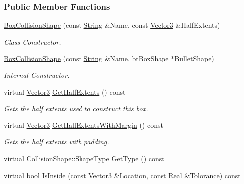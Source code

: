 \subsubsection*{Public Member Functions}
\begin{DoxyCompactItemize}
\item 
\hyperlink{classphys_1_1BoxCollisionShape_a1739863d96d1e4eea34eea8a47ec097f}{BoxCollisionShape} (const \hyperlink{namespacephys_aa03900411993de7fbfec4789bc1d392e}{String} \&Name, const \hyperlink{classphys_1_1Vector3}{Vector3} \&HalfExtents)
\begin{DoxyCompactList}\small\item\em Class Constructor. \item\end{DoxyCompactList}\item 
\hyperlink{classphys_1_1BoxCollisionShape_af2da95ac48a04d5ea89426720d57d704}{BoxCollisionShape} (const \hyperlink{namespacephys_aa03900411993de7fbfec4789bc1d392e}{String} \&Name, btBoxShape $\ast$BulletShape)
\begin{DoxyCompactList}\small\item\em Internal Constructor. \item\end{DoxyCompactList}\item 
virtual \hyperlink{classphys_1_1Vector3}{Vector3} \hyperlink{classphys_1_1BoxCollisionShape_af3cf295f6333d27e546bf935bcb85c26}{GetHalfExtents} () const 
\begin{DoxyCompactList}\small\item\em Gets the half extents used to construct this box. \item\end{DoxyCompactList}\item 
virtual \hyperlink{classphys_1_1Vector3}{Vector3} \hyperlink{classphys_1_1BoxCollisionShape_ac18b6ff19bc6f361b349522335d6e1de}{GetHalfExtentsWithMargin} () const 
\begin{DoxyCompactList}\small\item\em Gets the half extents with padding. \item\end{DoxyCompactList}\item 
virtual \hyperlink{classphys_1_1CollisionShape_af3ba4fd8af5b9557f912d2f5ff35a588}{CollisionShape::ShapeType} \hyperlink{classphys_1_1BoxCollisionShape_add1d8632477c121255e291d145e44cee}{GetType} () const 
\item 
virtual bool \hyperlink{classphys_1_1BoxCollisionShape_a99e3df140d921e96bc8c0745edc97296}{IsInside} (const \hyperlink{classphys_1_1Vector3}{Vector3} \&Location, const \hyperlink{namespacephys_af7eb897198d265b8e868f45240230d5f}{Real} \&Tolorance) const 

\end{DoxyCompactItemize}
